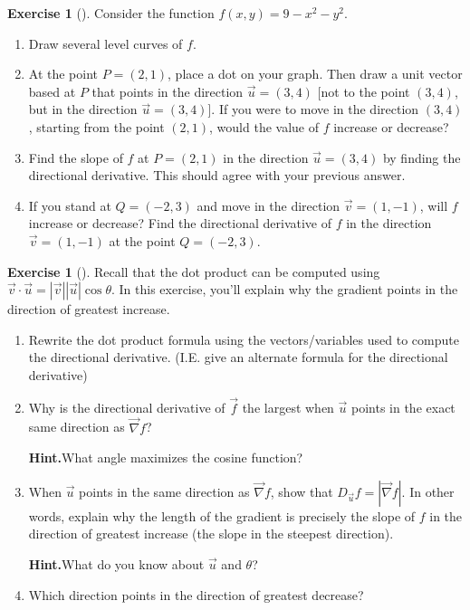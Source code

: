 \documentclass[10pt,]{book}
\theoremstyle{plain}
\theoremstyle{definition}
\theoremstyle{definition}
\theoremstyle{definition}
\theoremstyle{definition}
\newtheorem{exploration}[project]{Exercise}
\theoremstyle{definition}
\numberwithin{equation}{section}
\begin{document}
\begin{exploration}[]\label{exploration-226}
Consider the function \(f(x,y) = 9-x^2-y^2\).%
\begin{enumerate}[font=\bfseries,label=(\alph*),ref=\alph*]
\item\label{task-612} Draw several level curves of \(f\).%
\item\label{task-613} At the point \(P=(2,1)\), place a dot on your graph. Then draw a unit vector based at \(P\) that points in the direction \(\vec u=(3,4)\) [not to the point \((3,4)\), but in the direction \(\vec u=(3,4)\)]. If you were to move in the direction \((3,4)\), starting from the point \((2,1)\), would the value of \(f\) increase or decrease?%
\item\label{task-614} Find the slope of \(f\) at \(P=(2,1)\) in the direction \(\vec u=(3,4)\) by finding the directional derivative. This should agree with your previous answer.%
\item\label{task-615} If you stand at \(Q=(-2,3)\) and move in the direction \(\vec v= (1,-1)\), will \(f\) increase or decrease?  Find the directional derivative of \(f\) in the direction \(\vec v=(1,-1)\) at the point \(Q=(-2,3)\).%
\end{enumerate}
\end{exploration}
\begin{exploration}[]\label{exploration-227}
Recall that the dot product can be computed using \(\vec{v} \cdot \vec{u} = |\vec{v}||\vec{u}|\cos \theta\). In this exercise, you'll explain why the gradient points in the direction of greatest increase.%
\begin{enumerate}[font=\bfseries,label=(\alph*),ref=\alph*]
\item\label{task-616} Rewrite the dot product formula using the vectors/variables used to compute the directional derivative. (I.E. give an alternate formula for the directional derivative)%
\item\label{task-617} Why is the directional derivative of \(\vec f\) the largest when \(\vec u\) points in the exact same direction as \(\vec \nabla f\)?%
\par\medskip\noindent%
\textbf{Hint.}\quad What angle maximizes the cosine function?%
\item\label{task-618} When \(\vec u\) points in the same direction as \(\vec \nabla f\), show that \(D_{\vec u}f = |\vec \nabla f|\). In other words, explain why the length of the gradient is precisely the slope of \(f\) in the direction of greatest increase (the slope in the steepest direction).%
\par\medskip\noindent%
\textbf{Hint.}\quad What do you know about \(\vec{u}\) and \(\theta\)?%
\item\label{task-619} Which direction points in the direction of greatest decrease?%
\end{enumerate}
\end{exploration}
\end{document}
